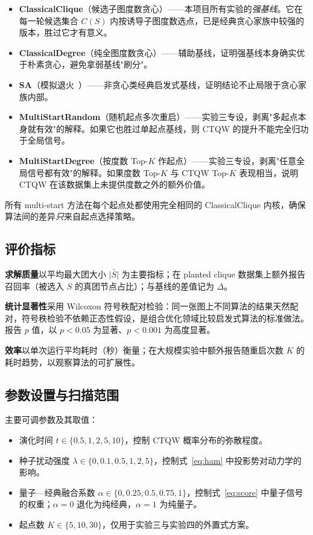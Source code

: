 \documentclass[pre,twocolumn]{revtex4-2}
\begin{document}
\begin{itemize}
\item \textbf{ClassicalClique}（候选子图度数贪心）——本项目所有实验的\emph{强基线}。它在每一轮候选集合 $C(S)$ 内按诱导子图度数选点，已是经典贪心家族中较强的版本，胜过它才有意义。
\item \textbf{ClassicalDegree}（纯全图度数贪心）——辅助基线，证明强基线本身确实优于朴素贪心，避免拿弱基线"刷分"。
\item \textbf{SA}（模拟退火~\cite{kirkpatrick1983}）——非贪心类经典启发式基线，证明结论不止局限于贪心家族内部。
\item \textbf{MultiStartRandom}（随机起点多次重启）——实验三专设，剥离"多起点本身就有效"的解释。如果它也胜过单起点基线，则 CTQW 的提升不能完全归功于全局信号。
\item \textbf{MultiStartDegree}（按度数 Top-$K$ 作起点）——实验三专设，剥离"任意全局信号都有效"的解释。如果度数 Top-$K$ 与 CTQW Top-$K$ 表现相当，说明 CTQW 在该数据集上未提供度数之外的额外价值。
\end{itemize}

所有 multi-start 方法在每个起点处都使用完全相同的 ClassicalClique 内核，确保算法间的差异\emph{只}来自起点选择策略。

\subsection{评价指标}
\textbf{求解质量}以平均最大团大小 $\bar{|S|}$ 为主要指标；在 planted clique 数据集上额外报告召回率（被选入 $S$ 的真团节点占比）；与基线的差值记为 $\Delta$。

\textbf{统计显著性}采用 Wilcoxon 符号秩配对检验：同一张图上不同算法的结果天然配对，符号秩检验不依赖正态性假设，是组合优化领域比较启发式算法的标准做法。报告 $p$ 值，以 $p<0.05$ 为显著、$p<0.001$ 为高度显著。

\textbf{效率}以单次运行平均耗时（秒）衡量；在大规模实验中额外报告随重启次数 $K$ 的耗时趋势，以观察算法的可扩展性。

\subsection{参数设置与扫描范围}
主要可调参数及其取值：
\begin{itemize}
\item 演化时间 $t\in\{0.5,1,2,5,10\}$，控制 CTQW 概率分布的弥散程度。
\item 种子扰动强度 $\lambda\in\{0,0.1,0.5,1,2,5\}$，控制式~\eqref{eq:ham} 中投影势对动力学的影响。
\item 量子—经典融合系数 $\alpha\in\{0,0.25,0.5,0.75,1\}$，控制式~\eqref{eq:score} 中量子信号的权重；$\alpha=0$ 退化为纯经典，$\alpha=1$ 为纯量子。
\item 起点数 $K\in\{5,10,30\}$，仅用于实验三与实验四的外置式方案。
\end{itemize}
\end{document}

